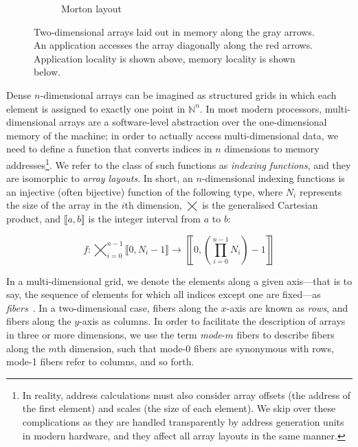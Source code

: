 \begin{figure}
\begin{subfigure}{0.48\columnwidth}
        \caption{Morton layout}
        \label{fig:locality_example:morton}
    \end{subfigure}
    \caption{Two-dimensional arrays laid out in memory along the gray arrows. An application accesses the array diagonally along the red arrows. Application locality is shown above, memory locality is shown below.}
    \label{fig:locality_example}
\end{figure}

Dense $n$-dimensional arrays can be imagined as structured grids in which each element is assigned to exactly one point in $\mathbb{N}^n$. In most modern processors, multi-dimensional arrays are a software-level abstraction over the one-dimensional memory of the machine; in order to actually access multi-dimensional data, we need to define a function that converts indices in $n$ dimensions to memory addresses\footnote{In reality, address calculations must also consider array offsets (the address of the first element) and scales (the size of each element). We skip over these complications as they are handled transparently by address generation units in modern hardware, and they affect all array layouts in the same manner.}. We refer to the class of such functions as \emph{indexing functions}, and they are isomorphic to \emph{array layouts}. In short, an $n$-dimensional indexing functions is an injective (often bijective) function of the following type, where $N_i$ represents the size of the array in the $i$th dimension, $\bigtimes$ is the generalised Cartesian product, and $\llbracket a, b\rrbracket$ is the integer interval from $a$ to $b$:

\begin{equation}
f : \bigtimes_{i=0}^{n-1} \llbracket 0,N_i - 1 \rrbracket \to \left\llbracket0,\left(\prod_{i=0}^{n-1} N_i\right) - 1 \right\rrbracket
\end{equation}

In a multi-dimensional grid, we denote the elements along a given axis---that is to say, the sequence of elements for which all indices except one are fixed---as \emph{fibers}~\cite{doi:10.1137/07070111X}. In a two-dimensional case, fibers along the $x$-axis are known as \emph{rows}, and fibers along the $y$-axis as columns. In order to facilitate the description of arrays in three or more dimensions, we use the term \emph{mode}-$m$ fibers to describe fibers along the $m$th dimension, such that mode-0 fibers are synonymous with rows, mode-1 fibers refer to columns, and so forth.

